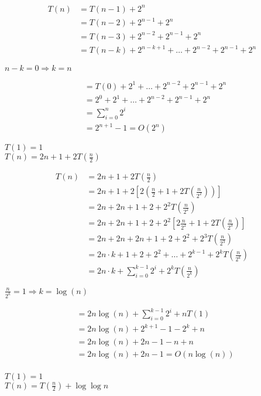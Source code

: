 \vspace{-0.1cm}
\begin{align*}
    T(n) &= T(n-1) + 2^n\\
         &= T(n-2) + 2^{n-1} + 2^n\\
         &= T(n-3) + 2^{n-2} + 2^{n-1} + 2^{n}\\
         &= T(n-k) + 2^{n-k+1} + \dots + 2^{n-2} + 2^{n-1} + 2^{n}
\end{align*}

\(n-k = 0 \Rightarrow \boxed{k = n}\)

\begin{align*}
    &=T(0) + 2^{1} + \dots + 2^{n-2} + 2^{n-1} + 2^{n}\\
    &=2^{0} + 2^{1} + \dots + 2^{n-2} + 2^{n-1} + 2^{n}\\
    &=\sum_{i=0}^{n} 2^{i}\\
    &=2^{n+1} - 1 = \boxed{O(2^n)}
\end{align*}    

\vspace{0.75cm}
\( T(1) = 1\)\\
\( T(n) = 2n+1+2T(\frac{n}{2}) \)

\begin{align*}
T(n) &= 2n+1+2T(\frac{n}{2})\\
     &= 2n+1+2[2(\frac{n}{2} + 1 + 2T(\frac{n}{2^2}))]\\
     &= 2n+2n+1+2+2^2T(\frac{n}{2^2})\\
     &= 2n+2n+1+2+2^2[2\frac{n}{2^2}+1+2T(\frac{n}{2^3})]\\
     &= 2n+2n+2n+1+2+2^2+2^3T(\frac{n}{2^3})\\
     &= 2n\cdot k +1+2+2^2+\dots+2^{k-1}+2^kT(\frac{n}{2^k})\\
     &= 2n\cdot k+ \sum_{i=0}^{k-1} 2^i+2^kT(\frac{n}{2^k})
\end{align*}


\(\frac{n}{2^k} = 1 \Rightarrow \boxed{k = \log(n)}\)

\begin{align*}
&= 2n\log(n)+ \sum_{i=0}^{k-1} 2^i+nT(1)\\
&= 2n\log(n) + 2^{k+1} - 1 - 2^{k} +n\\
&= 2n\log(n) + 2n - 1 - n+n\\
&= 2n\log(n) + 2n - 1 = \boxed{O(n\log(n))}\\
\end{align*}


\newpage
\(T(1) = 1\)\\
\(T(n) = T(\frac{n}{2}) + \log\log n\)

